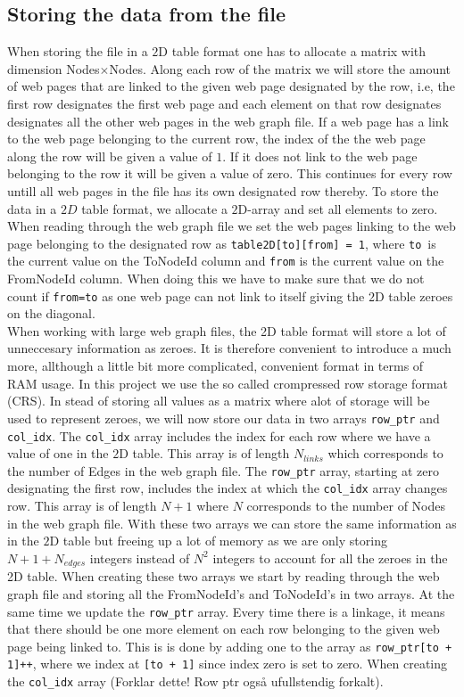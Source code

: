 \documentclass[onecolumn]{aastex62}
\begin{document}
\subsection{Storing the data from the file}
When storing the file in a $2$D table format one has to allocate a matrix with dimension Nodes$\times$Nodes. Along each row of the matrix we will store the amount of web pages that are linked to the given web page designated by the row, i.e, the first row designates the first web page and each element on that row designates designates all the other web pages in the web graph file. If a web page has a link to the web page belonging to the current row, the index of the the web page along the row will be given a value of $1$. If it does not link to the web page belonging to the row it will be given a value of zero. This continues for every row untill all web pages in the file has its own designated row thereby. To store the data in a $2D$ table format, we allocate a $2$D-array and set all elements to zero. When reading through the web graph file we set the web pages linking to the web page belonging to the designated row as \texttt{table2D[to][from] = 1}, where \texttt{to} is the current value on the ToNodeId column and \texttt{from} is the current value on the FromNodeId column. When doing this we have to make sure that we do not count if \texttt{from=to} as one web page can not link to itself giving the $2$D table zeroes on the diagonal.\\

When working with large web graph files, the 2D table format will store a lot of unneccesary information as zeroes. It is therefore convenient to introduce a much more, allthough a little bit more complicated, convenient format in terms of RAM usage. In this project we use the so called crompressed row storage format (CRS). In stead of storing all values as a matrix where alot of storage will be used to represent zeroes, we will now store our data in two arrays \texttt{row\_ptr} and \texttt{col\_idx}. The \texttt{col\_idx} array includes the index for each row where we have a value of one in the $2$D table. This array is of length $N_{links}$ which corresponds to the number of Edges in the web graph file. The \texttt{row\_ptr} array, starting at zero designating the first row, includes the index at which the \texttt{col\_idx} array changes row. This array is of length $N + 1$ where $N$ corresponds to the number of Nodes in the web graph file. With these two arrays we can store the same information as in the $2$D table but freeing up a lot of memory as we are only storing $N + 1 + N_{edges}$ integers instead of $N^2$ integers to account for all the zeroes in the 2D table. When creating these two arrays we start by reading through the web graph file and storing all the FromNodeId's and ToNodeId's in two arrays. At the same time  we update the \texttt{row\_ptr} array. Every time there is a linkage, it means that there should be one more element on each row belonging to the given web page being linked to.  This is is done by adding one to the array as \texttt{row\_ptr[to + 1]++}, where we index at \texttt{[to + 1]} since index zero is set to zero. When creating the \texttt{col\_idx} array (Forklar dette! Row ptr også ufullstendig forkalt).
\end{document}
